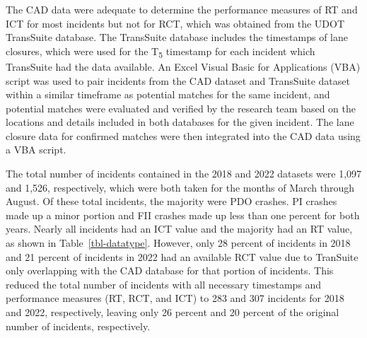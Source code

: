 \documentclass[
  letterpaper,
  authoryear]{elsarticle}
\begin{document}
The CAD data were adequate to determine the performance measures of RT
and ICT for most incidents but not for RCT, which was obtained from the
UDOT TransSuite database. The TransSuite database includes the
timestamps of lane closures, which were used for the T\textsubscript{5}
timestamp for each incident which TransSuite had the data available. An
Excel Visual Basic for Applications (VBA) script was used to pair
incidents from the CAD dataset and TransSuite dataset within a similar
timeframe as potential matches for the same incident, and potential
matches were evaluated and verified by the research team based on the
locations and details included in both databases for the given incident.
The lane closure data for confirmed matches were then integrated into
the CAD data using a VBA script.

The total number of incidents contained in the 2018 and 2022 datasets
were 1,097 and 1,526, respectively, which were both taken for the months
of March through August. Of these total incidents, the majority were PDO
crashes. PI crashes made up a minor portion and FII crashes made up less
than one percent for both years. Nearly all incidents had an ICT value
and the majority had an RT value, as shown in Table~\ref{tbl-datatype}.
However, only 28 percent of incidents in 2018 and 21 percent of
incidents in 2022 had an available RCT value due to TranSuite only
overlapping with the CAD database for that portion of incidents. This
reduced the total number of incidents with all necessary timestamps and
performance measures (RT, RCT, and ICT) to 283 and 307 incidents for
2018 and 2022, respectively, leaving only 26 percent and 20 percent of
the original number of incidents, respectively.
\end{document}
